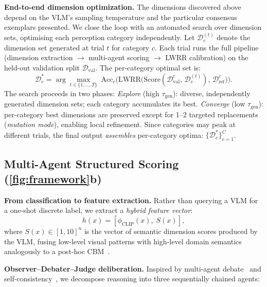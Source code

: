 \documentclass[runningheads]{llncs}
\begin{document}
\smallskip\noindent\textbf{End-to-end dimension optimization.}
The dimensions discovered above depend on the VLM's sampling temperature and the particular consensus exemplars presented.
We close the loop with an automated search over dimension sets, optimising each perception category independently.
Let $\mathcal{D}_c^{(t)}$ denote the dimension set generated at trial $t$ for category $c$.
Each trial runs the full pipeline (dimension extraction $\to$ multi-agent scoring $\to$ LWRR calibration) on the held-out validation split $\mathcal{D}_{\mathrm{val}}$.
The per-category optimal set is:
\begin{equation}
\mathcal{D}_c^{*} = \arg\max_{t \in \{1,\ldots,T\}} \;\mathrm{Acc}_c\bigl(\text{LWRR}\bigl(\text{Score}(\mathcal{D}_{\mathrm{val}}^{c},\, \mathcal{D}_c^{(t)}),\, \mathcal{D}_{\mathrm{ref}}^{c}\bigr)\bigr).
\label{eq:e2e}
\end{equation}
The search proceeds in two phases:
\emph{Explore} (high $\tau_{\mathrm{gen}}$): diverse, independently generated dimension sets; each category accumulates its best.
\emph{Converge} (low $\tau_{\mathrm{gen}}$): per-category best dimensions are preserved except for 1--2 targeted replacements (\emph{mutation mode}), enabling local refinement.
Since categories may peak at different trials, the final output \emph{assembles} per-category optima: $\{\mathcal{D}_c^{*}\}_{c=1}^{C}$.

\subsection{Multi-Agent Structured Scoring (\cref{fig:framework}b)}
\label{sec:stage2}

\noindent\textbf{From classification to feature extraction.}
Rather than querying a VLM for a one-shot discrete label, we extract a \emph{hybrid feature vector}:
\begin{equation}
h(x) = [\phi_{\text{CLIP}}(x),\; S(x)],
\label{eq:hybrid}
\end{equation}
where $S(x)\in[1,10]^{n}$ is the vector of semantic dimension scores produced by the VLM, fusing low-level visual patterns with high-level domain semantics analogously to a post-hoc CBM~\cite{yuksekgonul2023posthoc}.

\smallskip\noindent\textbf{Observer--Debater--Judge deliberation.}
Inspired by multi-agent debate~\cite{du2024improving,liang2024encouraging} and self-consistency~\cite{wang2023selfconsistency}, we decompose reasoning into three sequentially chained agents:
\end{document}
